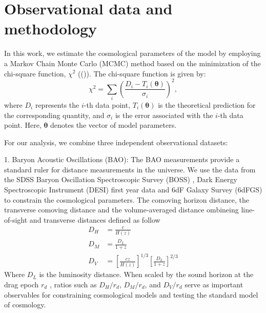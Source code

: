 \documentclass[preprint]{aastex631}
\begin{document}

\section{Observational data and methodology}

In this work, we estimate the cosmological parameters of the model by employing a Markov Chain Monte Carlo (MCMC) method based on the minimization of the chi-square function, \(\chi^2\) ((\cite{Padilla_2021})). The chi-square function is given by:
\begin{equation}
\chi^2 = \sum_i \left(\frac{D_i - T_i(\mathbf{\theta})}{\sigma_i}\right)^2,
\end{equation}
where \(D_i\) represents the \(i\)-th data point, \(T_i(\mathbf{\theta})\) is the theoretical prediction for the corresponding quantity, and \(\sigma_i\) is the error associated with the \(i\)-th data point. Here, \(\mathbf{\theta}\) denotes the vector of model parameters.

For our analysis, we combine three independent observational datasets:

1. Baryon Acoustic Oscillations (BAO): The BAO measurements provide a standard ruler for distance measurements in the universe. We use the data from the SDSS Baryon Oscillation Spectroscopic Survey (BOSS) , Dark Energy Spectroscopic Instrument (DESI) first year data and 6dF Galaxy Survey (6dFGS) to constrain the cosmological parameters. The comoving horizon distance, the transverse comoving distance
and the volume-averaged distance ombineing line-of-sight and transverse distances defined as follow
\begin{align}
    D_H&=\frac{c}{H(z)} \\
    D_M&=\frac{D_L}{1+z}\\
    D_V&=\left[\frac{cz}{H(z)}\right]^{1/3}\left[\frac{D_L}{1+z}\right]^{2/3}
\end{align}
Where $D_L$ is the luminosity distance. When scaled by the sound horizon at the drag epoch \(r_d\) , ratios such as \(D_H/r_d\), \(D_M/r_d\), and \(D_V/r_d\) serve as important observables for constraining cosmological models and testing the standard model of cosmology.
\end{document}
